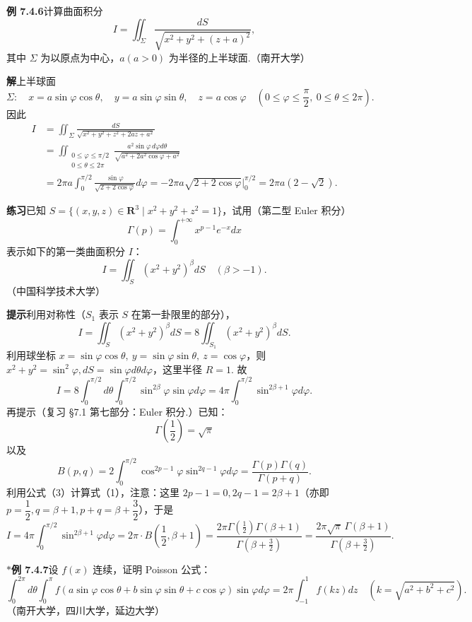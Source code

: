 \documentclass[UTF8,12pt,a4paper,fontset=fandol]{ctexart}
\begin{document}
\noindent\textbf{例 7.4.6}\quad 计算曲面积分
\[
I=\iint_\Sigma\frac{dS}{\sqrt{x^2+y^2+(z+a)^2}},
\]
其中 $\Sigma$ 为以原点为中心，$a(a>0)$ 为半径的上半球面.（南开大学）

\noindent\textbf{解}\quad 上半球面
\[
\Sigma:\quad x=a\sin\varphi\cos\theta,\quad
y=a\sin\varphi\sin\theta,\quad z=a\cos\varphi
\quad\left(0\le\varphi\le\frac\pi2,\ 0\le\theta\le2\pi\right).
\]
因此
\[
\begin{aligned}
I&=\iint_\Sigma\frac{dS}{\sqrt{x^2+y^2+z^2+2az+a^2}}\\
&=\iint_{\substack{0\le\varphi\le\pi/2\\0\le\theta\le2\pi}}
\frac{a^2\sin\varphi\,d\varphi d\theta}{\sqrt{a^2+2a^2\cos\varphi+a^2}}\\
&=2\pi a\int_0^{\pi/2}\frac{\sin\varphi}{\sqrt{2+2\cos\varphi}}d\varphi
=-2\pi a\sqrt{2+2\cos\varphi}\bigg|_0^{\pi/2}
=2\pi a(2-\sqrt2).
\end{aligned}
\]

\noindent\textbf{练习}\quad 已知 $S=\{(x,y,z)\in\mathbf R^3\mid x^2+y^2+z^2=1\}$，试用（第二型 Euler 积分）
\[
\Gamma(p)=\int_0^{+\infty}x^{p-1}e^{-x}dx
\]
表示如下的第一类曲面积分 $I$：
\[
I=\iint_S(x^2+y^2)^\beta dS\quad(\beta>-1).
\]
（中国科学技术大学）

\noindent\textbf{提示}\quad 利用对称性（$S_1$ 表示 $S$ 在第一卦限里的部分），
\[
I=\iint_S(x^2+y^2)^\beta dS
=8\iint_{S_1}(x^2+y^2)^\beta dS.
\]
利用球坐标 $x=\sin\varphi\cos\theta,\ y=\sin\varphi\sin\theta,\ z=\cos\varphi$，则 $x^2+y^2=\sin^2\varphi,dS=\sin\varphi d\theta d\varphi$，这里半径 $R=1$. 故
\[
I=8\int_0^{\pi/2}d\theta\int_0^{\pi/2}\sin^{2\beta}\varphi\sin\varphi d\varphi
=4\pi\int_0^{\pi/2}\sin^{2\beta+1}\varphi d\varphi.
\tag{1}
\]
再提示（复习 §7.1 第七部分：Euler 积分.）已知：
\[
\Gamma\left(\frac12\right)=\sqrt\pi
\tag{2}
\]
以及
\[
B(p,q)=2\int_0^{\pi/2}\cos^{2p-1}\varphi\sin^{2q-1}\varphi d\varphi
=\frac{\Gamma(p)\Gamma(q)}{\Gamma(p+q)}.
\tag{3}
\]
利用公式（3）计算式（1），注意：这里 $2p-1=0,2q-1=2\beta+1$（亦即 $p=\dfrac12,q=\beta+1,p+q=\beta+\dfrac32$），于是
\[
I=4\pi\int_0^{\pi/2}\sin^{2\beta+1}\varphi d\varphi
=2\pi\cdot B\left(\frac12,\beta+1\right)
=\frac{2\pi\Gamma\left(\frac12\right)\Gamma(\beta+1)}
{\Gamma\left(\beta+\frac32\right)}
=\frac{2\pi\sqrt\pi\,\Gamma(\beta+1)}
{\Gamma\left(\beta+\frac32\right)}.
\]

\noindent\textbf{$*$例 7.4.7}\quad 设 $f(x)$ 连续，证明 Poisson 公式：
\[
\int_0^{2\pi}d\theta\int_0^\pi
f(a\sin\varphi\cos\theta+b\sin\varphi\sin\theta+c\cos\varphi)
\sin\varphi d\varphi
=2\pi\int_{-1}^1f(kz)dz
\quad\left(k=\sqrt{a^2+b^2+c^2}\right).
\tag{1}
\]
（南开大学，四川大学，延边大学）
\end{document}
